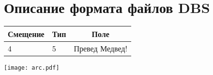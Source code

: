 
\chapter{
  Описание формата файлов DBS
}
\label{app:dbs}

\newcommand{\dbsRecord}[1]{
  \noindent
  \begin{tabularx}{\textwidth}{|p{3em}|p{4em}|X|}
    \hline
    \multicolumn{1}{|c|}{Смещение} &
    \multicolumn{1}{c|}{Тип}      &
    \multicolumn{1}{c|}{Поле}     \\
    \hline
    #1
    \\
    \hline
  \end{tabularx}
}

\dbsRecord{
  4 & 5 & Превед Медвед!
}

\texttt{[image: arc.pdf]}
